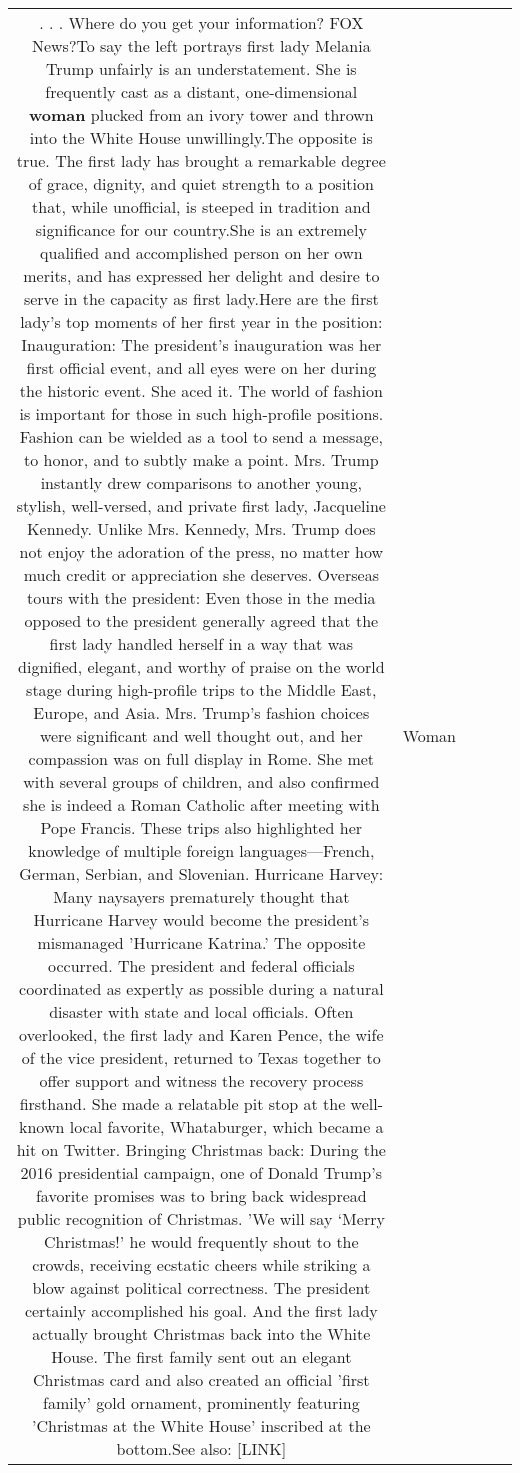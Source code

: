 \documentclass[11pt]{article}
\newlength\mylength
\begin{document}
\begin{center}
\begin{longtable}{|C{.65\mylength}|C{.30\mylength}|C{.12\mylength}|C{.12\mylength}|C{.12\mylength}|}
  \small {} . . . Where do you get your information? FOX News?To say the left portrays first lady Melania Trump unfairly is an understatement. She is frequently cast as a distant, one-dimensional \textbf{woman} plucked from an ivory tower and thrown into the White House unwillingly.The opposite is true. The first lady has brought a remarkable degree of grace, dignity, and quiet strength to a position that, while unofficial, is steeped in tradition and significance for our country.She is an extremely qualified and accomplished person on her own merits, and has expressed her delight and desire to serve in the capacity as first lady.Here are the first lady's top moments of her first year in the position:    Inauguration: The president's inauguration was her first official event, and all eyes were on her during the historic event. She aced it. The world of fashion is important for those in such high-profile positions. Fashion can be wielded as a tool to send a message, to honor, and to subtly make a point. Mrs. Trump instantly drew comparisons to another young, stylish, well-versed, and private first lady, Jacqueline Kennedy. Unlike Mrs. Kennedy, Mrs. Trump does not enjoy the adoration of the press, no matter how much credit or appreciation she deserves.    Overseas tours with the president: Even those in the media opposed to the president generally agreed that the first lady handled herself in a way that was dignified, elegant, and worthy of praise on the world stage during high-profile trips to the Middle East, Europe, and Asia. Mrs. Trump's fashion choices were significant and well thought out, and her compassion was on full display in Rome. She met with several groups of children, and also confirmed she is indeed a Roman Catholic after meeting with Pope Francis. These trips also highlighted her knowledge of multiple foreign languages—French, German, Serbian, and Slovenian. Hurricane Harvey: Many naysayers prematurely thought that Hurricane Harvey would become the president's mismanaged 'Hurricane Katrina.' The opposite occurred. The president and federal officials coordinated as expertly as possible during a natural disaster with state and local officials. Often overlooked, the first lady and Karen Pence, the wife of the vice president, returned to Texas together to offer support and witness the recovery process firsthand. She made a relatable pit stop at the well-known local favorite, Whataburger, which became a hit on Twitter.    Bringing Christmas back: During the 2016 presidential campaign, one of Donald Trump's favorite promises was to bring back widespread public recognition of Christmas. 'We will say ‘Merry Christmas!' he would frequently shout to the crowds, receiving ecstatic cheers while striking a blow against political correctness. The president certainly accomplished his goal. And the first lady actually brought Christmas back into the White House. The first family sent out an elegant Christmas card and also created an official 'first family' gold ornament, prominently featuring 'Christmas at the White House' inscribed at the bottom.See also:  [LINK] \normalsize   & Woman & 
\end{longtable}
\end{center}
\end{document}
